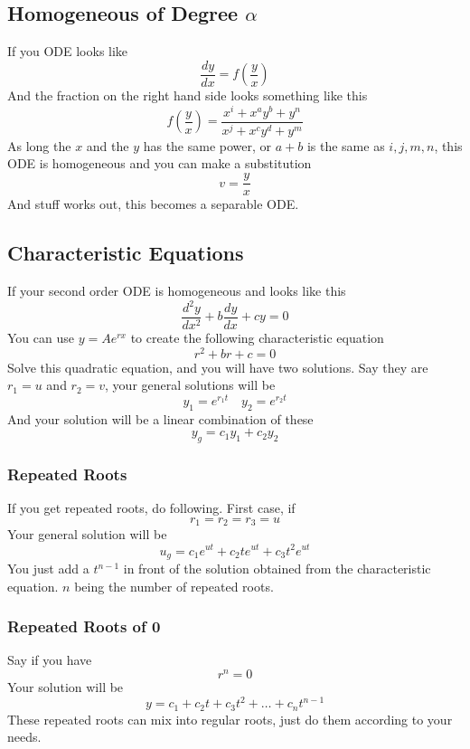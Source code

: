 \documentclass[12pt]{article}
\newcommand{\dydx}[2]{\frac{d #1}{d #2}}
\newcommand{\paren}[1]{\left( #1 \right)}
\begin{document}
\subsection{Homogeneous of Degree $\alpha$}
If you ODE looks like
\[
\dydx{y}{x} = f\paren{\frac{y}{x}}
\]
And the fraction on the right hand side looks something like this
\[
f\paren{\frac{y}{x}} = \frac{x^i + x^{a}y^{b}+y^n}{x^j + x^{c}y^{d}+y^m}
\]
As long the $x$ and the $y$ has the same power, or $a+b$ is the same as $i,j,m,n$, this ODE is homogeneous and you can make a substitution
\[
v = \frac{y}{x}
\]
And stuff works out, this becomes a separable ODE. 

\subsection{Characteristic Equations}
If your second order ODE is homogeneous and looks like this
\[
\dydx{^2y}{x^2} + b\dydx{y}{x}+ cy = 0
\]
You can use $y = Ae^{rx}$ to create the following characteristic equation
\[
r^2 + br + c = 0
\]
Solve this quadratic equation, and you will have two solutions. Say they are $r_1 = u$ and $r_2 = v$, your general solutions will be
\[
y_1 = e^{r_1 t} \quad y_2 = e^{r_2 t}
\]
And your solution will be a linear combination of these
\[
y_g = c_1 y_1 + c_2 y_2
\]

\subsubsection{Repeated Roots}
If you get repeated roots, do following. First case, if 
\[
r_1 = r_2 = r_3 = u
\]
Your general solution will be
\[
u_g = c_1e^{ut} + c_2 te^{ut} + c_3 t^2 e^{ut}
\]
You just add a $t^{n-1}$ in front of the solution obtained from the characteristic equation. $n$ being the number of repeated roots. 

\subsubsection{Repeated Roots of 0}
Say if you have
\[
r^n = 0
\]
Your solution will be 
\[
y = c_1 + c_2t + c_3 t^2 + \ldots + c_n t^{n-1}
\]
These repeated roots can mix into regular roots, just do them according to your needs. 
\end{document}
